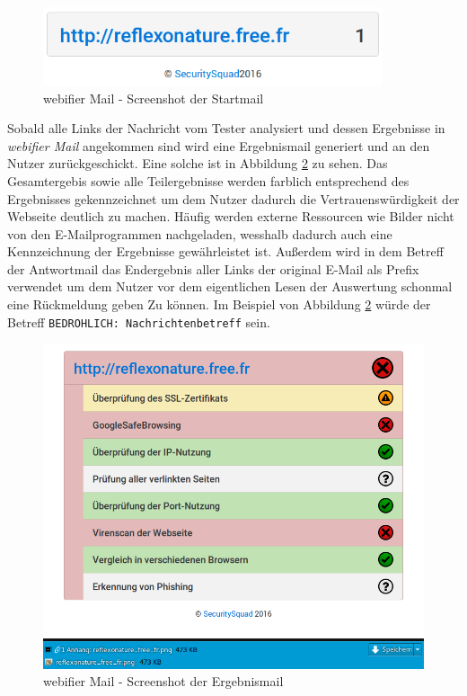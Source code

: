 \begin{figure}[H]
	\centering
	\includegraphics[width=10cm]{images/mail-start.png}
	\caption{webifier Mail - Screenshot der Startmail}
	\label{fig:mail-start}
\end{figure}

Sobald alle Links der Nachricht vom Tester analysiert und dessen Ergebnisse in \textit{webifier Mail} angekommen sind wird eine Ergebnismail generiert und an den Nutzer zurückgeschickt. Eine solche ist in Abbildung \ref{fig:mail-result} zu sehen. Das Gesamtergebis sowie alle Teilergebnisse werden farblich entsprechend des Ergebnisses gekennzeichnet um dem Nutzer dadurch die Vertrauenswürdigkeit der Webseite deutlich zu machen. Häufig werden externe Ressourcen wie Bilder nicht von den E-Mailprogrammen nachgeladen, wesshalb dadurch auch eine Kennzeichnung der Ergebnisse gewährleistet ist. Außerdem wird in dem Betreff der Antwortmail das Endergebnis aller Links der original E-Mail als Prefix verwendet um dem Nutzer vor dem eigentlichen Lesen der Auswertung schonmal eine Rückmeldung geben Zu können. Im Beispiel von Abbildung \ref{fig:mail-result} würde der Betreff \lstinline[style=eclipse]{BEDROHLICH: Nachrichtenbetreff} sein.

\begin{figure}[H]
	\centering
	\includegraphics[width=15cm]{images/mail-result.png}
	\caption{webifier Mail - Screenshot der Ergebnismail}
	\label{fig:mail-result}
\end{figure}


